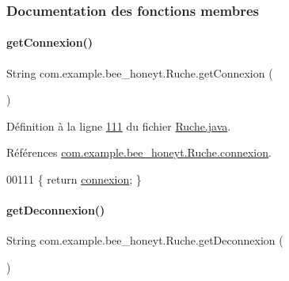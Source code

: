 \subsubsection{Documentation des fonctions membres}
\mbox{\label{classcom_1_1example_1_1bee__honeyt_1_1_ruche_abe485f3c2af62e324ffed32bb84c796f}} 
\paragraph{\texorpdfstring{get\+Connexion()}{getConnexion()}}
{\footnotesize\ttfamily String com.\+example.\+bee\+\_\+honeyt.\+Ruche.\+get\+Connexion (\begin{DoxyParamCaption}{ }\end{DoxyParamCaption})}



Définition à la ligne \hyperlink{_ruche_8java_source_l00111}{111} du fichier \hyperlink{_ruche_8java_source}{Ruche.\+java}.



Références \hyperlink{_ruche_8java_source_l00021}{com.\+example.\+bee\+\_\+honeyt.\+Ruche.\+connexion}.


\begin{DoxyCode}
00111 \{ \textcolor{keywordflow}{return}  \hyperlink{classcom_1_1example_1_1bee__honeyt_1_1_ruche_a8b1b18ca9364533f66214ed9daea875e}{connexion}; \}
\end{DoxyCode}
\mbox{\label{classcom_1_1example_1_1bee__honeyt_1_1_ruche_a57fc0d510a3e9594e24b6586fcbea9ef}} 
\paragraph{\texorpdfstring{get\+Deconnexion()}{getDeconnexion()}}
{\footnotesize\ttfamily String com.\+example.\+bee\+\_\+honeyt.\+Ruche.\+get\+Deconnexion (\begin{DoxyParamCaption}{ }\end{DoxyParamCaption})}



